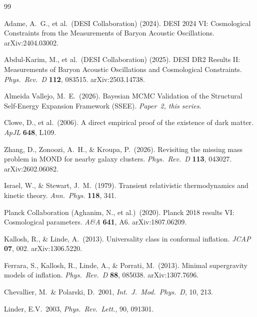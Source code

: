 \documentclass[12pt,a4paper]{article}
\begin{document}
\clearpage

\begin{thebibliography}{99}

Adame, A.~G., et al.\ (DESI Collaboration) (2024).
DESI 2024 VI: Cosmological Constraints from the Measurements of Baryon
Acoustic Oscillations.
arXiv:2404.03002.

Abdul-Karim, M., et al.\ (DESI Collaboration) (2025).
DESI DR2 Results II: Measurements of Baryon Acoustic Oscillations and Cosmological Constraints.
\textit{Phys.\ Rev.\ D} \textbf{112}, 083515.
arXiv:2503.14738.

Almeida Vallejo, M.~E.\ (2026).
Bayesian MCMC Validation of the Structural Self-Energy Expansion Framework (SSEE).
\textit{Paper~2, this series}.

Clowe, D., et al.\ (2006).
A direct empirical proof of the existence of dark matter.
\textit{ApJL} \textbf{648}, L109.

Zhang, D., Zonoozi, A.~H., \& Kroupa, P.\ (2026).
Revisiting the missing mass problem in MOND for nearby galaxy clusters.
\textit{Phys.\ Rev.\ D} \textbf{113}, 043027.
arXiv:2602.06082.

Israel, W., \& Stewart, J.~M.\ (1979).
Transient relativistic thermodynamics and kinetic theory.
\textit{Ann.\ Phys.} \textbf{118}, 341.

Planck Collaboration (Aghanim, N., et al.)\ (2020).
Planck 2018 results VI: Cosmological parameters.
\textit{A\&A} \textbf{641}, A6.
arXiv:1807.06209.

Kallosh, R., \& Linde, A.\ (2013).
Universality class in conformal inflation.
\textit{JCAP} \textbf{07}, 002.
arXiv:1306.5220.

Ferrara, S., Kallosh, R., Linde, A., \& Porrati, M.\ (2013).
Minimal supergravity models of inflation.
\textit{Phys.\ Rev.\ D} \textbf{88}, 085038.
arXiv:1307.7696.

Chevallier, M.\ \& Polarski, D.\ 2001, \textit{Int.\ J.\ Mod.\ Phys.\ D}, 10, 213.

Linder, E.V.\ 2003, \textit{Phys.\ Rev.\ Lett.}, 90, 091301.


\end{thebibliography}
\end{document}
